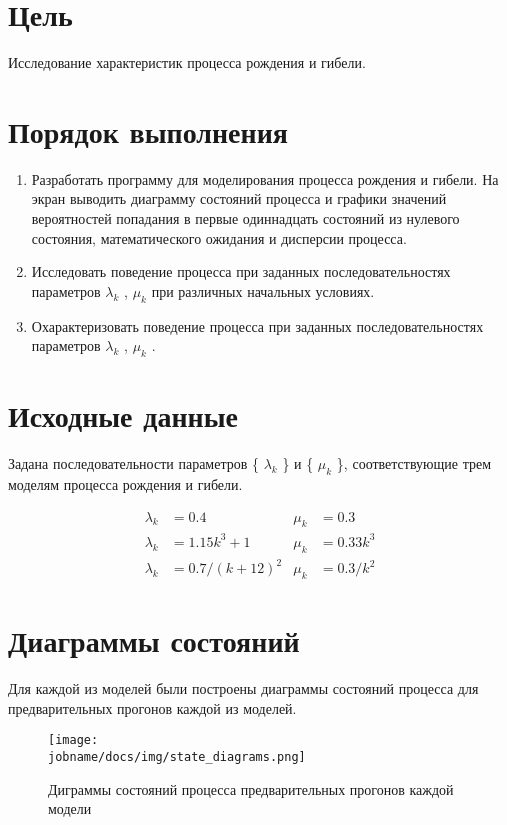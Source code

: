 \section*{Цель}

Исследование характеристик процесса рождения и гибели.

\section*{Порядок выполнения}

\begin{enumerate}
    \item Разработать программу для моделирования процесса рождения и гибели.
    На экран выводить диаграмму состояний процесса и графики значений вероятностей попадания в первые одиннадцать состояний из нулевого состояния, математического ожидания и дисперсии процесса.
    \item Исследовать поведение процесса при заданных последовательностях параметров { $\lambda_k$ }, { $\mu_k$ } при различных начальных условиях.
    \item Охарактеризовать поведение процесса при заданных последовательностях параметров { $\lambda_k$ }, { $\mu_k$ }.
\end{enumerate}

\section*{Исходные данные}

Задана последовательности параметров \{ $\lambda_k$ \} и \{ $\mu_k$ \}, соответствующие трем моделям процесса рождения и
гибели.

\begin{align*}
    \lambda_k & = 0.4 & \mu_k & = 0.3\\
    \lambda_k & = 1.15k^3 + 1 & \mu_k & = 0.33k^3\\
    \lambda_k & = 0.7 / (k + 12)^2 & \mu_k & = 0.3 / k^2
\end{align*}

\section*{Диаграммы состояний}

Для каждой из моделей были построены диаграммы состояний процесса для предварительных прогонов каждой из моделей.

\begin{figure}[h!]
    \centering
    \texttt{[image: \\jobname/docs/img/state\_diagrams.png]}
    \caption{Диграммы состояний процесса предварительных прогонов каждой модели}
\end{figure}

